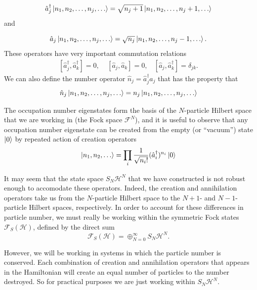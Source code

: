 \documentclass[a4paper,10pt]{article}
\begin{document}
\begin{equation}
 \hat{a}_{j}^{\dagger}\ket{n_1,n_2,\dots,n_{j},\dots}=\sqrt{n_j+1}\ket{n_1,n_2,\dots,n_{j}+1,\dots}
\end{equation}
and 

\begin{equation}
 \hat{a}_{j}\ket{n_1,n_2,\dots,n_{j},\dots}=\sqrt{n_j}\ket{n_1,n_2,\dots,n_{j}-1,\dots}.
\end{equation}
These operators have very important commutation relations
\begin{equation}
\begin{align*}
 [\hat{a}_{j}^{\dagger},\hat{a}_{k}^{\dagger}]=0, \ \ \ \ \ [\hat{a}_{j},\hat{a}_{k}]=0,\ \ \ \ [\hat{a}_{j},\hat{a}_{k}^{\dagger}]=\delta_{jk}.
 \end{align*}
\end{equation}
We can also define the number operator $\hat{n}_j=\hat{a}_{j}^{\dagger}\hat{a}_j$ that has the property that
\begin{equation}
 \hat{n}_{j}\ket{n_1,n_2,\dots,n_{j},\dots}=n_{j}\ket{n_1,n_2,\dots,n_{j},\dots}
\end{equation}

The occupation number eigenstates form the basis of the $N$-particle Hilbert space that we are working in (the Fock space $\mathcal{F}^N$), and it 
is useful to observe that any occupation number eigenstate can be created from the empty (or ``vacuum'') state $\ket{0}$ by repeated action of 
creation operators \cite{Altland2010}
\begin{equation}
 \ket{n_1,n_2,\dots}=\prod_i\frac{1}{\sqrt{n_i!}}(\hat{a}_i^{\dagger})^{n_i}\ket{0}
\end{equation}

It may seem that the state space $S_N\mathcal{H}^N$ that we have constructed is not robust enough to accomodate these operators. Indeed, the creation and
annihilation operators take us from the $N$-particle Hilbert space to the $N+1$- and $N-1$-particle Hilbert spaces, respectively. In order to
account for these differences in particle number, we must really be working within the symmetric Fock states $\mathcal{F}_S(\mathcal{H})$, defined by the direct sum \cite{Blank1999}
\begin{equation}
 \mathcal{F}_S(\mathcal{H})=\oplus_{N=0}^\infty S_N\mathcal{H}^N.
\end{equation}

However, we will be working in systems in which the particle number is conserved. Each combination of creation and annihilation operators that appears in the Hamiltonian
will create an equal number of particles to the number destroyed. So for practical purposes we are just working within $S_N\mathcal{H}^N$.
\end{document}
